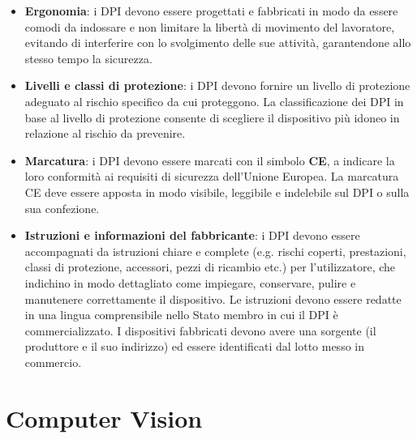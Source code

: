 \begin{itemize}
    \item \textbf{Ergonomia}: i DPI devono essere progettati e fabbricati in modo da essere comodi da indossare e non limitare la libertà di movimento del lavoratore, evitando di interferire con lo svolgimento delle sue attività, garantendone allo stesso tempo la sicurezza. 
    
    \item \textbf{Livelli e classi di protezione}: i DPI devono fornire un livello di protezione adeguato al rischio specifico da cui proteggono. La classificazione dei DPI in base al livello di protezione consente di scegliere il dispositivo più idoneo in relazione al rischio da prevenire.
    
    \item \textbf{Marcatura}: i DPI devono essere marcati con il simbolo \textbf{CE}, a indicare la loro conformità ai requisiti di sicurezza dell'Unione Europea. La marcatura CE deve essere apposta in modo visibile, leggibile e indelebile sul DPI o sulla sua confezione.

    \item \textbf{Istruzioni e informazioni del fabbricante}: i DPI devono essere accompagnati da istruzioni chiare e complete (e.g. rischi coperti, prestazioni, classi di protezione, accessori, pezzi di ricambio etc.) per l'utilizzatore, che indichino in modo dettagliato come impiegare, conservare, pulire e manutenere correttamente il dispositivo. Le istruzioni devono essere redatte in una lingua comprensibile nello Stato membro in cui il DPI è commercializzato. I dispositivi fabbricati devono avere una sorgente (il produttore e il suo indirizzo) ed essere identificati dal lotto messo in commercio.
\end{itemize} 

\section{Computer Vision}

